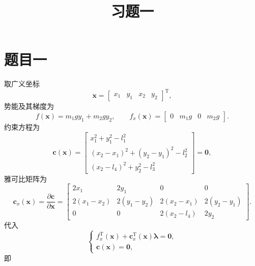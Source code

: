 \documentclass[fontset=fandol,12pt,a4paper]{ctexart}
\title{习题一}
\author{}
\date{}
\begin{document}
\maketitle

\section{题目一}

取广义坐标
\[
	\boldsymbol{x} = \begin{bmatrix} x_1 & y_1 & x_2 & y_2 \end{bmatrix}^{\mathrm{T}} ,
\]
势能及其梯度为
\[
	f(\boldsymbol{x}) = m_1 g y_1 + m_2 g y_2 ,
	\qquad
	f_{x}(\boldsymbol{x}) = \begin{bmatrix} 0 & m_1 g & 0 & m_2 g \end{bmatrix} .
\]
约束方程为
\[
	\boldsymbol{c}(\boldsymbol{x}) =
	\begin{bmatrix}
		x_1^2 + y_1^2 - l_1^2                        \\
		(x_2 - x_1)^2 + (y_2 - y_1)^2 - l_2^2        \\
		(x_2 - l_4)^2 + y_2^2 - l_3^2
	\end{bmatrix}
	= \boldsymbol{0} ,
\]
雅可比矩阵为
\[
	\boldsymbol{c}_{x}(\boldsymbol{x}) = \frac{\partial \boldsymbol{c}}{\partial \boldsymbol{x}} =
	\begin{bmatrix}
		2x_1         & 2y_1         & 0             & 0             \\[2pt]
		2(x_1 - x_2) & 2(y_1 - y_2) & 2(x_2 - x_1)  & 2(y_2 - y_1)  \\[2pt]
		0            & 0            & 2(x_2 - l_4)  & 2y_2
	\end{bmatrix} .
\]
代入
\[
	\begin{cases}
		f_{x}^{\mathrm{T}}(\boldsymbol{x}) + \boldsymbol{c}_{x}^{\mathrm{T}}(\boldsymbol{x}) \boldsymbol{\lambda} = \boldsymbol{0} , \\[0.6em]
		\boldsymbol{c}(\boldsymbol{x}) = \boldsymbol{0} ,
	\end{cases}
\]
即
\end{document}
